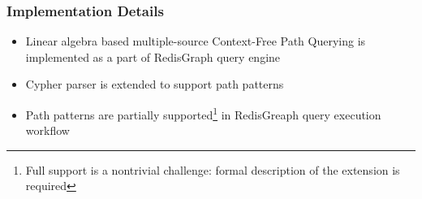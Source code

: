 \documentclass[xcolor=table,aspectratio=169]{beamer}
\begin{document}
\begin{frame}[fragile]
\begin{minipage}[m]{0.55\linewidth}
    {
    }


  \end{minipage}


\end{frame}


\begin{frame}[fragile] \frametitle{Implementation Details}
  \begin{itemize}
  \item Linear algebra based multiple-source Context-Free Path Querying is implemented as a part of RedisGraph query engine
  \item Cypher parser is extended to support path patterns
  \item Path patterns are partially supported\footnote{Full support is a nontrivial challenge: formal description of the extension is required} in RedisGreaph query execution workflow
  \end{itemize}

\end{frame}
\end{document}
